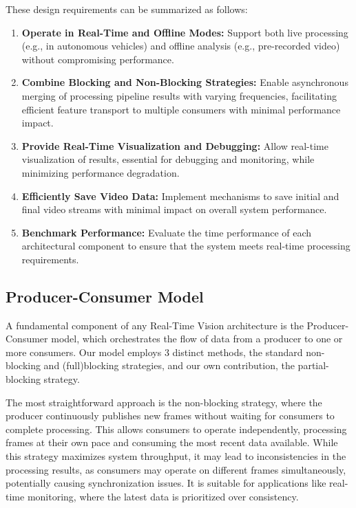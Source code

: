 \documentclass[conference]{IEEEtran}
\begin{document}
These design requirements can be summarized as follows:
\begin{enumerate}
    \item \textbf{Operate in Real-Time and Offline Modes:} Support both live processing (e.g., in autonomous vehicles) and offline analysis (e.g., pre-recorded video) without compromising performance.
    \item \textbf{Combine Blocking and Non-Blocking Strategies:} Enable asynchronous merging of processing pipeline results with varying frequencies, facilitating efficient feature transport to multiple consumers with minimal performance impact.
    \item \textbf{Provide Real-Time Visualization and Debugging:} Allow real-time visualization of results, essential for debugging and monitoring, while minimizing performance degradation.
    \item \textbf{Efficiently Save Video Data:} Implement mechanisms to save initial and final video streams with minimal impact on overall system performance.
    \item \textbf{Benchmark Performance:} Evaluate the time performance of each architectural component to ensure that the system meets real-time processing requirements.
\end{enumerate}

\subsection{Producer-Consumer Model}
\label{sec:producer-consumer}

A fundamental component of any Real-Time Vision architecture is the Producer-Consumer model, which orchestrates the flow of data from a producer to one or more consumers.
Our model employs 3 distinct methods, the standard non-blocking and (full)blocking strategies, and our own contribution, the partial-blocking strategy.

The most straightforward approach is the non-blocking strategy, where the producer continuously publishes new frames without waiting for consumers to complete processing.
This allows consumers to operate independently, processing frames at their own pace and consuming the most recent data available.
While this strategy maximizes system throughput, it may lead to inconsistencies in the processing results, as consumers may operate on different frames simultaneously, potentially causing synchronization issues.
It is suitable for applications like real-time monitoring, where the latest data is prioritized over consistency.
\end{document}
